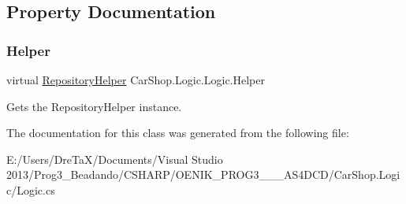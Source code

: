 \subsection{Property Documentation}
\mbox{\label{class_car_shop_1_1_logic_1_1_logic_afd4e310134ff008f7726801974519e46}} 
\subsubsection{\texorpdfstring{Helper}{Helper}}
{\footnotesize\ttfamily virtual \mbox{\hyperlink{class_car_shop_1_1_repository_1_1_repository_helper}{Repository\+Helper}} Car\+Shop.\+Logic.\+Logic.\+Helper\hspace{0.3cm}{\ttfamily [get]}}



Gets the Repository\+Helper instance. 



The documentation for this class was generated from the following file\+:\begin{DoxyCompactItemize}
\item 
E\+:/\+Users/\+Dre\+Ta\+X/\+Documents/\+Visual Studio 2013/\+Prog3\+\_\+\+Beadando/\+C\+S\+H\+A\+R\+P/\+O\+E\+N\+I\+K\+\_\+\+P\+R\+O\+G3\+\_\+\_\+\_\+\+A\+S4\+D\+C\+D/\+Car\+Shop.\+Logic/Logic.\+cs\end{DoxyCompactItemize}
